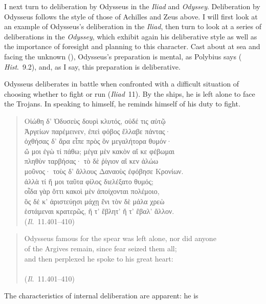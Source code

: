\documentclass[12pt,letterpaper,oneside,final]{memoir}
\begin{document}
I next turn to deliberation by Odysseus in the \emph{Iliad} and \emph{Odyssey}. Deliberation by Odysseus follows the style of those of Achilles and Zeus above. I will first look at an example of Odysseus's deliberation in the \emph{Iliad}, then turn to look at a series of deliberations in the \emph{Odyssey}, which exhibit again his deliberative style as well as the importance of foresight and planning to this character. Cast about at sea and facing the unknown (), Odysseus's preparation is mental, as Polybius says ( \emph{Hist}.~9.2), and, as I say, this preparation is deliberative.

Odysseus deliberates in battle when confronted with a difficult situation of choosing whether to fight or run (\emph{Iliad}~11). By the ships, he is left alone to face the Trojans. In speaking to himself, he reminds himself of his duty to fight. \begin{verse}\SingleSpacing \textgreek{Οἰώθη δ' Ὀδυσεὺς δουρὶ κλυτός, οὐδέ τις αὐτῷ \\ Ἀργείων παρέμεινεν, ἐπεὶ φόβος ἔλλαβε πάντας· \\ ὀχθήσας δ' ἄρα εἶπε πρὸς ὃν μεγαλήτορα θυμόν· \\ ὤ μοι ἐγὼ τί πάθω; μέγα μὲν κακὸν αἴ κε φέβωμαι \\ πληθὺν ταρβήσας· τὸ δὲ ῥίγιον αἴ κεν ἁλώω \\ μοῦνος· τοὺς δ' ἄλλους Δαναοὺς ἐφόβησε Κρονίων. \\ ἀλλὰ τί ἤ μοι ταῦτα φίλος διελέξατο θυμός; \\ οἶδα γὰρ ὅττι κακοὶ μὲν ἀποίχονται πολέμοιο, \\ ὃς δέ κ' ἀριστεύῃσι μάχῃ ἔνι τὸν δὲ μάλα χρεὼ \\ ἑστάμεναι κρατερῶς, ἤ τ' ἔβλητ' ἤ τ' ἔβαλ' ἄλλον.} \\ (\emph{Il.}~11.401--410)\end{verse} \begin{verse}\SingleSpacing Odysseus famous for the spear was left alone, nor did anyone \\ of the Argives remain, since fear seized them all; \\ and then perplexed he spoke to his great heart: \\  \\ (\emph{Il.}~11.401--410)\end{verse} \DoubleSpacing The characteristics of internal deliberation are apparent: he is 
\end{document}
